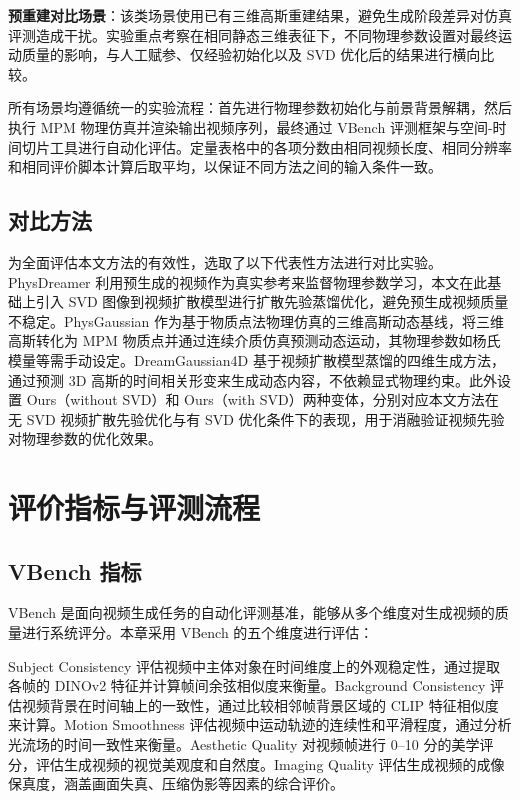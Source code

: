 \textbf{预重建对比场景}：该类场景使用已有三维高斯重建结果，避免生成阶段差异对仿真评测造成干扰。实验重点考察在相同静态三维表征下，不同物理参数设置对最终运动质量的影响，与人工赋参、仅经验初始化以及 SVD 优化后的结果进行横向比较。

所有场景均遵循统一的实验流程：首先进行物理参数初始化与前景背景解耦，然后执行 MPM\cite{mpm} 物理仿真并渲染输出视频序列，最终通过 VBench 评测框架与空间-时间切片工具进行自动化评估。定量表格中的各项分数由相同视频长度、相同分辨率和相同评价脚本计算后取平均，以保证不同方法之间的输入条件一致。

\subsection{对比方法}
为全面评估本文方法的有效性，选取了以下代表性方法进行对比实验。PhysDreamer\cite{physdreamer} 利用预生成的视频作为真实参考来监督物理参数学习，本文在此基础上引入 SVD 图像到视频扩散模型进行扩散先验蒸馏优化，避免预生成视频质量不稳定。PhysGaussian\cite{physgaussian} 作为基于物质点法物理仿真的三维高斯动态基线，将三维高斯转化为 MPM 物质点并通过连续介质仿真预测动态运动，其物理参数如杨氏模量等需手动设定。DreamGaussian4D\cite{dreamgaussian4d} 基于视频扩散模型蒸馏的四维生成方法，通过预测 3D 高斯的时间相关形变来生成动态内容，不依赖显式物理约束。此外设置 Ours（without SVD）和 Ours（with SVD）两种变体，分别对应本文方法在无 SVD 视频扩散先验优化与有 SVD 优化条件下的表现，用于消融验证视频先验对物理参数的优化效果。

\section{评价指标与评测流程}

\subsection{VBench 指标}
VBench 是面向视频生成任务的自动化评测基准，能够从多个维度对生成视频的质量进行系统评分。本章采用 VBench 的五个维度进行评估：

Subject Consistency 评估视频中主体对象在时间维度上的外观稳定性，通过提取各帧的 DINOv2 特征并计算帧间余弦相似度来衡量。Background Consistency 评估视频背景在时间轴上的一致性，通过比较相邻帧背景区域的 CLIP 特征相似度来计算。Motion Smoothness 评估视频中运动轨迹的连续性和平滑程度，通过分析光流场的时间一致性来衡量。Aesthetic Quality 对视频帧进行 0--10 分的美学评分，评估生成视频的视觉美观度和自然度。Imaging Quality 评估生成视频的成像保真度，涵盖画面失真、压缩伪影等因素的综合评价。



